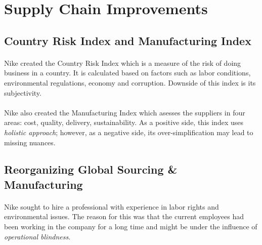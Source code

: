 \section{Supply Chain Improvements}

\subsection{Country Risk Index and Manufacturing Index}

\paragraph{} Nike created the Country Risk Index which is a measure of the risk of doing business in a country. It is calculated based on factors such as labor conditions, environmental regulations, economy and corruption. Downside of this index is its subjectivity.

\paragraph{} Nike also created the Manufacturing Index which asesses the suppliers in four areas: cost, quality, delivery, sustainability. As a positive side, this index uses \textit{holistic approach}; however, as a negative side, its over-simplification may lead to missing nuances. 

\subsection{Reorganizing Global Sourcing \& Manufacturing}

\paragraph{} Nike sought to hire a professional with experience in labor rights and environmental issues. The reason for this was that the current employees had been working in the company for a long time and might be under the influence of \textit{operational blindness}.